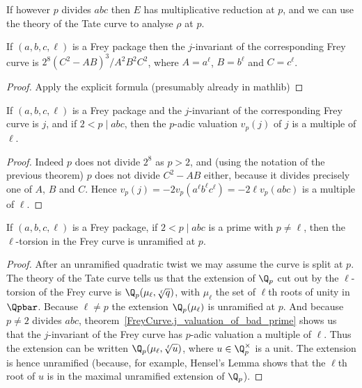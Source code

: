 If however $p$ divides $abc$ then $E$ has multiplicative
reduction at $p$, and we can use the theory of the Tate curve to analyse $\rho$ at $p$.

\begin{theorem}\label{Frey_curve_j}\leanok{} If $(a,b,c,\ell)$ is a Frey package then the $j$-invariant of the corresponding Frey curve is $2^8(C^2-AB)^3/A^2B^2C^2$, where $A=a^\ell$, $B=b^\ell$ and $C=c^\ell$.
\end{theorem}
\begin{proof}
  \leanok
  Apply the explicit formula (presumably already in mathlib)
\end{proof}

\begin{corollary}
  \label{FreyCurve.j_valuation_of_bad_prime}
  \leanok
  If $(a,b,c,\ell)$ is a Frey package and the $j$-invariant of the corresponding Frey curve is $j$, and if $2<p\mid abc$, then the $p$-adic valuation $v_p(j)$ of $j$ is a multiple of $\ell$.
\end{corollary}
\begin{proof}
  \leanok
  Indeed $p$ does not divide $2^8$ as $p>2$, and (using the notation of the previous theorem) $p$ does not divide $C^2-AB$ either, because it divides precisely one of $A$, $B$ and $C$. Hence $v_p(j)=-2v_p(a^\ell b^\ell c^\ell)=-2\ell v_p(abc)$ is a multiple of $\ell$.
\end{proof}

\begin{corollary}\label{Frey_curve_unram}\notready If $(a,b,c,\ell)$ is a Frey package, if $2<p\mid abc$
  is a prime with $p\not=\ell$, then the $\ell$-torsion in the Frey curve is unramified
  at $p$.
\end{corollary}
\begin{proof}
  After an unramified quadratic twist we may assume the curve is split at $p$.
  The theory of the Tate curve tells us that the extension of $\Q_p$ cut out by the $\ell$-torsion
  of the Frey curve is $\Q_p(\mu_\ell,\sqrt[\ell]{q})$, with $\mu_\ell$ the set of $\ell$th roots
  of unity in $\Qpbar$. Because $\ell\not=p$ the extension
  $\Q_p(\mu_\ell)$ is unramified at $p$. And because $p\not=2$ divides $abc$,
  theorem~\ref{FreyCurve.j_valuation_of_bad_prime} shows us that the $j$-invariant
  of the Frey curve has $p$-adic valuation a multiple of $\ell$.
  Thus the extension can be written $\Q_p(\mu_\ell,\sqrt[\ell]{u})$,
  where $u\in\Q_p^\times$ is a unit. The extension is hence unramified (because, for example,
  Hensel's Lemma shows that the $\ell$th root of $u$ is in the maximal unramified
  extension of $\Q_p$).
\end{proof}

